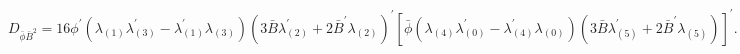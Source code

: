 \begin{equation*}
D_{\bar{\phi}\bar{B}^{2}}=16\phi ^{\prime }(\lambda _{(1)}\lambda
_{(3)}^{\prime }-\lambda _{(1)}^{\prime }\lambda _{(3)})(3\bar{B}\lambda
_{(2)}^{\prime }+2\bar{B}^{\prime }\lambda _{(2)})^{\prime }[\bar{\phi}%
(\lambda _{(4)}\lambda _{(0)}^{\prime }-\lambda _{(4)}^{\prime }\lambda
_{(0)})(3\bar{B}\lambda _{(5)}^{\prime }+2\bar{B}^{\prime }\lambda
_{(5)})]^{\prime }.
\end{equation*}

